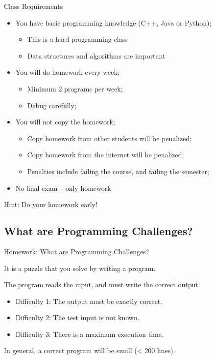 \begin{frame}{Class Requirements}
  \begin{exampleblock}{}
    \begin{itemize}
    \item You have basic programming knowledge (C++, Java or Python);
      \begin{itemize}
      \item This is a hard \alert{programming} class
      \item Data structures and algorithms are important
      \end{itemize}
      \medskip

    \item You will do homework every week;
      \begin{itemize}
        \item Minimum 2 programs per week; 
        \item Debug carefully;
      \end{itemize}
      \medskip

      \item You will not copy the homework;
      \begin{itemize}
        \item Copy homework from other students will be penalized;
        \item Copy homework from the internet will be penalized;
        \item Penalties include failing the course, and failing the semester;
      \end{itemize}
      \medskip

      \item No final exam -- only homework
    \end{itemize}
  \end{exampleblock}
  \hfill {Hint: Do your homework early!}
\end{frame}

\subsection{What are Programming Challenges?}
\begin{frame}{Homework: What are Programming Challenges?}

  It is a puzzle that you solve by writing a program.
  \bigskip

  The program reads the input, and must write the correct output.
  \begin{itemize}
  \item Difficulty 1: The output must be \alert{exactly} correct.
  \item Difficulty 2: The test input is \alert{not known}.
  \item Difficulty 3: There is a maximum \alert{execution time}.
  \end{itemize}\bigskip

  In general, a correct program will be small (< 200 lines).
\end{frame}


